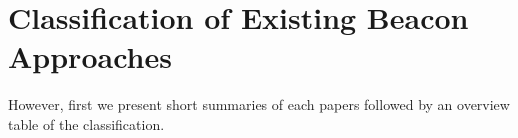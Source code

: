 \section{Classification of Existing Beacon Approaches}\label{sec:classification}
However, first we present short summaries of each papers followed by an overview table of the classification.
